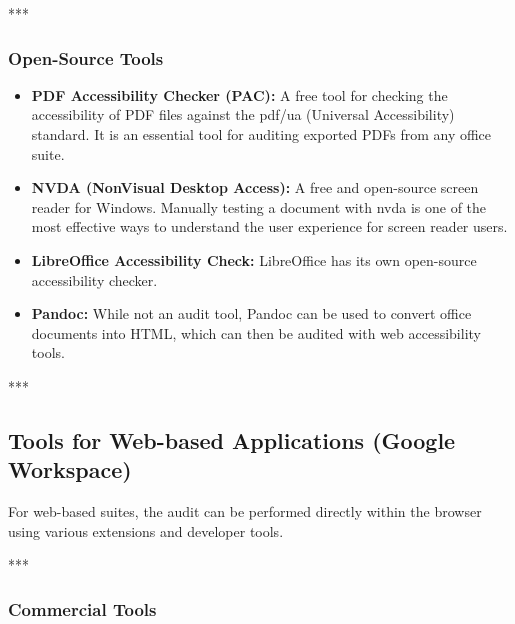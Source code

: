 ***

\subsubsection{Open-Source Tools}
\label{sub:open-source-tools}

\begin{itemize}
	\item \textbf{PDF Accessibility Checker (PAC)\supercite{AxesCheck}:} A free tool for checking the accessibility of PDF files against the \gls{pdf/ua} (Universal Accessibility) standard. It is an essential tool for auditing exported PDFs from any office suite.
	\item \textbf{NVDA (NonVisual Desktop Access)\supercite{NVDA}:} A free and open-source screen reader for Windows. Manually testing a document with \gls{nvda} is one of the most effective ways to understand the user experience for screen reader users.
	\item \textbf{LibreOffice Accessibility Check\supercite{AccessODF}:} LibreOffice has its own open-source accessibility checker.
	\item \textbf{Pandoc\supercite{Pandoc}:} While not an audit tool, Pandoc can be used to convert office documents into HTML, which can then be audited with web accessibility tools.
\end{itemize}

***

\subsection{Tools for Web-based Applications (Google Workspace)}
\label{sub:tools-for-web-based-applications-google-workspace}

For web-based suites, the audit can be performed directly within the browser using various extensions and developer tools.

***

\subsubsection{Commercial Tools}
\label{sub:commercial-tools-1}

